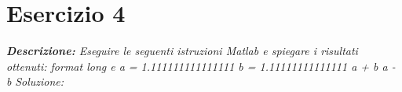 \section{Esercizio 4}
\textit{\textbf{Descrizione:} Eseguire le seguenti istruzioni Matlab e spiegare i risultati ottenuti:\newline\newline		
format long e\newline
a = 1.111111111111111\newline
b = 1.11111111111111\newline
a + b\newline
a - b}\newline
\newline
\emph{Soluzione: }\\~\\

